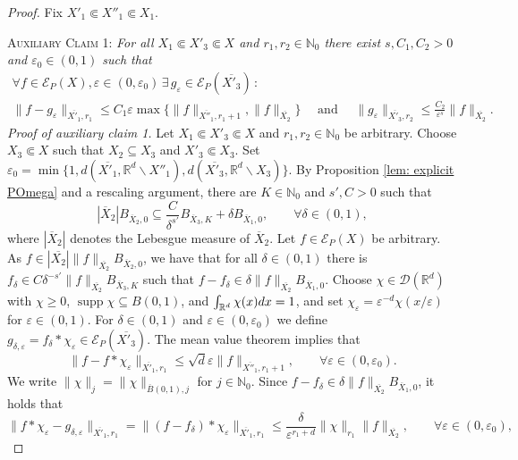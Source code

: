 \documentclass[12pt]{amsart}
\newcommand{\N}{\mathbb{N}}
\newcommand{\R}{\mathbb{R}}
\newcommand{\dx}{{\rm d}x }
\theoremstyle{definition}
\theoremstyle{remark}
\numberwithin{equation}{section}
\begin{document}
\begin{proof} Fix $X'_1 \Subset X''_1 \Subset X_1$.
	
	\textsc{Auxiliary Claim 1:} \emph{For all $X_1 \Subset X'_3 \Subset X$ and  $r_1,r_2\in\N_0$  there exist $s, C_1,C_2>0$ and $\varepsilon_0 \in (0,1)$ such that 
	\begin{gather*}
		 	\forall f\in\mathscr{E}_P(X), \varepsilon\in (0,\varepsilon_0) \,\exists\,g_\varepsilon \in\mathscr{E}_P(\overline{X'_3})\,: \\
		 \|f-g_\varepsilon\|_{\overline{X'_1},r_1}\leq C_1\varepsilon\max\{\|f\|_{\overline{X''_1}, r_1+1}, \|f\|_{\overline{X_2}}\} \quad
		\mbox{ and } \quad \|g_\varepsilon\|_{\overline{X'_3},r_2}\leq\frac{C_2}{\varepsilon^s}\|f\|_{\overline{X_2}}.
	\end{gather*}
	}
\emph{Proof of auxiliary claim 1.} Let $X_1 \Subset X'_3 \Subset X$ and $r_1,r_2\in\N_0$  be arbitrary. Choose $X_3 \Subset X$  such that $X_2 \subseteq X_3$ and $X'_3 \Subset X_3$. Set $\varepsilon_0 = \min \{1,d(\overline{X'_1}, \R^d \backslash X''_1), d(\overline{X'_3},\R^d \backslash X_3) \}$. By Proposition \ref{lem: explicit POmega} and a rescaling argument, there are  $K \in \N_0$ and $s',C >0$ such that 
$$
	| \overline{X}_2|B_{\overline{X}_2,0} \subseteq\frac{C}{\delta^{s'}} B_{\overline{X}_3,K}+\delta B_{\overline{X}_1,0}, \qquad \forall \delta \in (0,1),
$$
where $|\overline{X}_2|$ denotes the Lebesgue measure of $\overline{X}_2$. Let $f\in\mathscr{E}_P(X)$  be arbitrary. As $f \in | \overline{X_2}|\|f\|_{\overline{X_2}}B_{\overline{X}_2,0}$,  we have that for all $\delta \in (0,1)$ there is $f_\delta \in C\delta^{-s'}  \|f\|_{\overline{X_2}}B_{\overline{X}_3,K}$ such that $f - f_\delta \in \delta \|f\|_{\overline{X_2}}B_{\overline{X}_1,0}$. Choose $\chi \in \mathscr{D}(\R^d)$ with $\chi \geq 0$, $\operatorname{supp} \chi \subseteq B(0,1)$, and $\int_{\R^d} \chi(x) \dx = 1$, and set $\chi_\varepsilon = \varepsilon^{-d}\chi(x/\varepsilon)$ for $\varepsilon \in (0,1)$. For $\delta \in (0,1)$ and $\varepsilon \in (0,\varepsilon_0)$ we define $g_{\delta, \varepsilon} = f_\delta \ast \chi_\varepsilon \in \mathscr{E}_P(\overline{X'_3})$. The mean value theorem implies that
 $$
 \| f - f \ast \chi_\varepsilon\|_{\overline{X'_1}, r_1} \leq \sqrt{d} \varepsilon \|f\|_{\overline{X''_1}, r_1+1}, \qquad \forall \varepsilon \in (0,\varepsilon_0).
 $$
We write $\| \chi \|_{j} = \| \chi \|_{\overline{B}(0,1), j}$ for $j \in \N_0$. Since $f - f_\delta \in \delta \|f\|_{\overline{X_2}}B_{\overline{X}_1,0}$, it holds that
 $$
  \| f \ast \chi_\varepsilon - g_{\delta, \varepsilon}\|_{\overline{X'_1}, r_1} =   \| (f - f_\delta) \ast \chi_\varepsilon\|_{\overline{X'_1}, r_1} \leq \frac{\delta}{\varepsilon^{r_1 + d}} \| \chi \|_{r_1}\|f\|_{\overline{X_2}}, \qquad \forall \varepsilon \in (0,\varepsilon_0),
$$
\end{proof}
\end{document}
